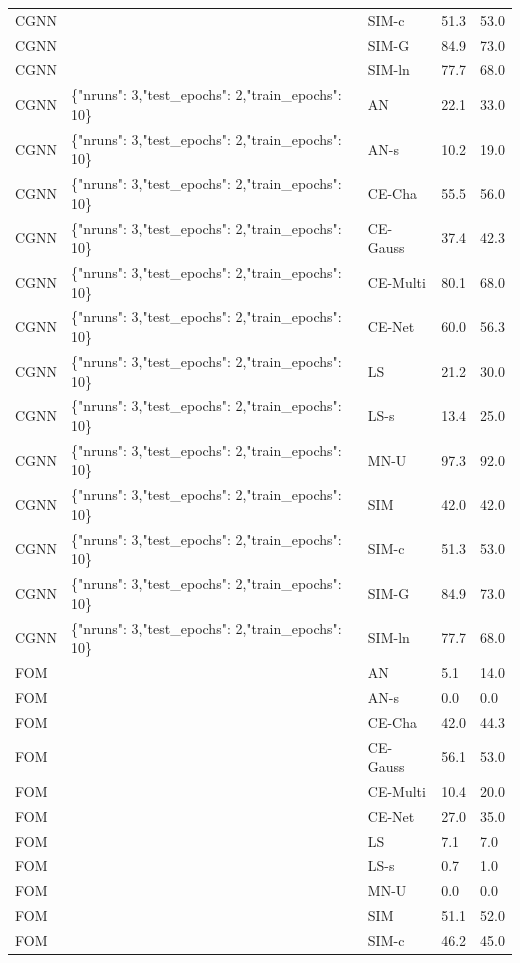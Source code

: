 \begin{tabular}{lllll}
CGNN &  & SIM-c & 51.3 & 53.0 \\
CGNN &  & SIM-G & 84.9 & 73.0 \\
CGNN &  & SIM-ln & 77.7 & 68.0 \\
CGNN & \{"nruns": 3,"test\_epochs": 2,"train\_epochs": 10\} & AN & 22.1 & 33.0 \\
CGNN & \{"nruns": 3,"test\_epochs": 2,"train\_epochs": 10\} & AN-s & 10.2 & 19.0 \\
CGNN & \{"nruns": 3,"test\_epochs": 2,"train\_epochs": 10\} & CE-Cha & 55.5 & 56.0 \\
CGNN & \{"nruns": 3,"test\_epochs": 2,"train\_epochs": 10\} & CE-Gauss & 37.4 & 42.3 \\
CGNN & \{"nruns": 3,"test\_epochs": 2,"train\_epochs": 10\} & CE-Multi & 80.1 & 68.0 \\
CGNN & \{"nruns": 3,"test\_epochs": 2,"train\_epochs": 10\} & CE-Net & 60.0 & 56.3 \\
CGNN & \{"nruns": 3,"test\_epochs": 2,"train\_epochs": 10\} & LS & 21.2 & 30.0 \\
CGNN & \{"nruns": 3,"test\_epochs": 2,"train\_epochs": 10\} & LS-s & 13.4 & 25.0 \\
CGNN & \{"nruns": 3,"test\_epochs": 2,"train\_epochs": 10\} & MN-U & 97.3 & 92.0 \\
CGNN & \{"nruns": 3,"test\_epochs": 2,"train\_epochs": 10\} & SIM & 42.0 & 42.0 \\
CGNN & \{"nruns": 3,"test\_epochs": 2,"train\_epochs": 10\} & SIM-c & 51.3 & 53.0 \\
CGNN & \{"nruns": 3,"test\_epochs": 2,"train\_epochs": 10\} & SIM-G & 84.9 & 73.0 \\
CGNN & \{"nruns": 3,"test\_epochs": 2,"train\_epochs": 10\} & SIM-ln & 77.7 & 68.0 \\
FOM &  & AN & 5.1 & 14.0 \\
FOM &  & AN-s & 0.0 & 0.0 \\
FOM &  & CE-Cha & 42.0 & 44.3 \\
FOM &  & CE-Gauss & 56.1 & 53.0 \\
FOM &  & CE-Multi & 10.4 & 20.0 \\
FOM &  & CE-Net & 27.0 & 35.0 \\
FOM &  & LS & 7.1 & 7.0 \\
FOM &  & LS-s & 0.7 & 1.0 \\
FOM &  & MN-U & 0.0 & 0.0 \\
FOM &  & SIM & 51.1 & 52.0 \\
FOM &  & SIM-c & 46.2 & 45.0 \\

\end{tabular}
